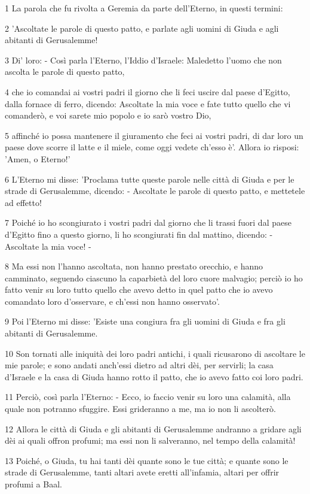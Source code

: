 \par 1 La parola che fu rivolta a Geremia da parte dell'Eterno, in questi termini:
\par 2 'Ascoltate le parole di questo patto, e parlate agli uomini di Giuda e agli abitanti di Gerusalemme!
\par 3 Di' loro: - Così parla l'Eterno, l'Iddio d'Israele: Maledetto l'uomo che non ascolta le parole di questo patto,
\par 4 che io comandai ai vostri padri il giorno che li feci uscire dal paese d'Egitto, dalla fornace di ferro, dicendo: Ascoltate la mia voce e fate tutto quello che vi comanderò, e voi sarete mio popolo e io sarò vostro Dio,
\par 5 affinché io possa mantenere il giuramento che feci ai vostri padri, di dar loro un paese dove scorre il latte e il miele, come oggi vedete ch'esso è'. Allora io risposi: 'Amen, o Eterno!'
\par 6 L'Eterno mi disse: 'Proclama tutte queste parole nelle città di Giuda e per le strade di Gerusalemme, dicendo: - Ascoltate le parole di questo patto, e mettetele ad effetto!
\par 7 Poiché io ho scongiurato i vostri padri dal giorno che li trassi fuori dal paese d'Egitto fino a questo giorno, li ho scongiurati fin dal mattino, dicendo: - Ascoltate la mia voce! -
\par 8 Ma essi non l'hanno ascoltata, non hanno prestato orecchio, e hanno camminato, seguendo ciascuno la caparbietà del loro cuore malvagio; perciò io ho fatto venir su loro tutto quello che avevo detto in quel patto che io avevo comandato loro d'osservare, e ch'essi non hanno osservato'.
\par 9 Poi l'Eterno mi disse: 'Esiste una congiura fra gli uomini di Giuda e fra gli abitanti di Gerusalemme.
\par 10 Son tornati alle iniquità dei loro padri antichi, i quali ricusarono di ascoltare le mie parole; e sono andati anch'essi dietro ad altri dèi, per servirli; la casa d'Israele e la casa di Giuda hanno rotto il patto, che io avevo fatto coi loro padri.
\par 11 Perciò, così parla l'Eterno: - Ecco, io faccio venir su loro una calamità, alla quale non potranno sfuggire. Essi grideranno a me, ma io non li ascolterò.
\par 12 Allora le città di Giuda e gli abitanti di Gerusalemme andranno a gridare agli dèi ai quali offron profumi; ma essi non li salveranno, nel tempo della calamità!
\par 13 Poiché, o Giuda, tu hai tanti dèi quante sono le tue città; e quante sono le strade di Gerusalemme, tanti altari avete eretti all'infamia, altari per offrir profumi a Baal.
